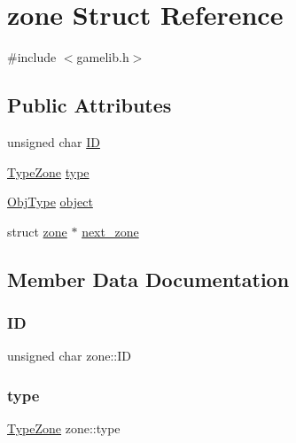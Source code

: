 \hypertarget{structzone}{}\section{zone Struct Reference}
\label{structzone}


{\ttfamily \#include $<$gamelib.\+h$>$}

\subsection*{Public Attributes}
\begin{DoxyCompactItemize}
\item 
unsigned char \hyperlink{structzone_a1d4fedce65d14eda936e77327f093986}{ID}
\item 
\hyperlink{gamelib_8h_a8bc11a12fbea40ab4ffab0cfcfa9b5af}{Type\+Zone} \hyperlink{structzone_a75b006d87a8b866d36e87ddb0dccf850}{type}
\item 
\hyperlink{gamelib_8h_a21ada50c882656c2a4723dde25f56d4a}{Obj\+Type} \hyperlink{structzone_a9438e3693d6b080a792c4e330687bc88}{object}
\item 
struct \hyperlink{structzone}{zone} $\ast$ \hyperlink{structzone_a9b53eeb46d4127a6eee08d08a0988972}{next\+\_\+zone}
\end{DoxyCompactItemize}


\subsection{Member Data Documentation}
\mbox{\label{structzone_a1d4fedce65d14eda936e77327f093986}} 
\subsubsection{\texorpdfstring{ID}{ID}}
{\footnotesize\ttfamily unsigned char zone\+::\+ID}

\mbox{\label{structzone_a75b006d87a8b866d36e87ddb0dccf850}} 
\subsubsection{\texorpdfstring{type}{type}}
{\footnotesize\ttfamily \hyperlink{gamelib_8h_a8bc11a12fbea40ab4ffab0cfcfa9b5af}{Type\+Zone} zone\+::type}

\mbox{\label{structzone_a9438e3693d6b080a792c4e330687bc88}} 
